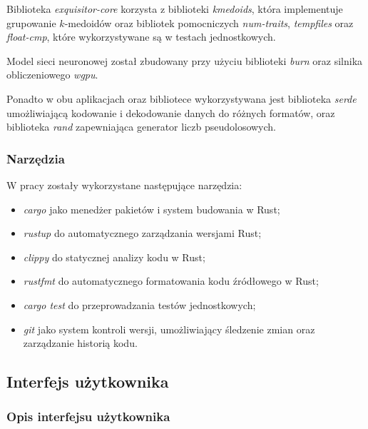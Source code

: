             Biblioteka \textit{exquisitor-core} korzysta z biblioteki \textit{kmedoids}\cite{Schubert:2022}, która implementuje grupowanie $k$-medoidów oraz bibliotek pomocniczych \textit{num-traits}, \textit{tempfiles} oraz \textit{float-cmp}, które wykorzystywane są w testach jednostkowych.

            Model sieci neuronowej został zbudowany przy użyciu biblioteki \textit{burn}\cite{Rust:burn} oraz silnika obliczeniowego \textit{wgpu}.

            Ponadto w obu aplikacjach oraz bibliotece wykorzystywana jest biblioteka \textit{serde}\cite{Rust:serde} umożliwiającą kodowanie i dekodowanie danych do różnych formatów, oraz biblioteka \textit{rand}\cite{Rust:rand} zapewniająca generator liczb pseudolosowych.

        \subsubsection{Narzędzia}

            W pracy zostały wykorzystane następujące narzędzia:
            \begin{itemize}
                \item \textit{cargo} jako menedżer pakietów i system budowania w Rust;
                \item \textit{rustup} do automatycznego zarządzania wersjami Rust;
                \item \textit{clippy} do statycznej analizy kodu w Rust;
                \item \textit{rustfmt} do automatycznego formatowania kodu źródłowego w Rust;
                \item \textit{cargo test} do przeprowadzania testów jednostkowych;
                \item \textit{git} jako system kontroli wersji, umożliwiający śledzenie zmian oraz zarządzanie historią kodu.
            \end{itemize}

    \subsection{Interfejs użytkownika}

        \subsubsection{Opis interfejsu użytkownika}

